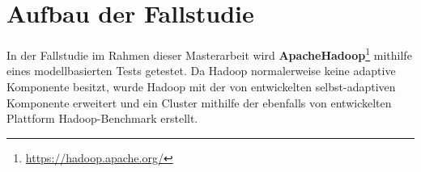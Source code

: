 \chapter{Aufbau der Fallstudie}\label{sec:fallstudie}

In der Fallstudie im Rahmen dieser Masterarbeit wird \textbf{Apache\texttrademark Hadoop\textregistered}\footnote{\url{https://hadoop.apache.org/}} mithilfe eines modellbasierten Tests getestet. Da Hadoop normalerweise keine adaptive Komponente besitzt, wurde Hadoop mit der von \citeauthor{zhang2016} entwickelten selbst-adaptiven Komponente erweitert und ein Cluster mithilfe der ebenfalls von \citeauthor{zhang2016} entwickelten Plattform Hadoop-Benchmark erstellt.





